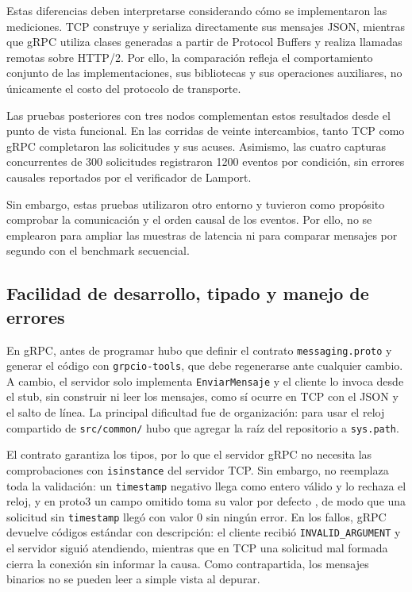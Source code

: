 Estas diferencias deben interpretarse considerando
cómo se implementaron las mediciones. TCP construye
y serializa directamente sus mensajes JSON, mientras
que gRPC utiliza clases generadas a partir de
Protocol Buffers y realiza llamadas remotas sobre
HTTP/2. Por ello, la comparación refleja el
comportamiento conjunto de las implementaciones,
sus bibliotecas y sus operaciones auxiliares,
no únicamente el costo del protocolo de transporte.

Las pruebas posteriores con tres nodos complementan
estos resultados desde el punto de vista funcional.
En las corridas de veinte intercambios, tanto TCP
como gRPC completaron las solicitudes y sus acuses.
Asimismo, las cuatro capturas concurrentes de
300 solicitudes registraron 1200 eventos por
condición, sin errores causales reportados por
el verificador de Lamport.

Sin embargo, estas pruebas utilizaron otro entorno
y tuvieron como propósito comprobar la comunicación
y el orden causal de los eventos. Por ello, no se
emplearon para ampliar las muestras de latencia
ni para comparar mensajes por segundo con el
benchmark secuencial.

\subsection{Facilidad de desarrollo, tipado y manejo de errores}

En gRPC, antes de programar hubo que definir el contrato \texttt{messaging.proto} y generar el código con \texttt{grpcio-tools}, que debe regenerarse ante cualquier cambio. A cambio, el servidor solo implementa \texttt{EnviarMensaje} y el cliente lo invoca desde el stub, sin construir ni leer los mensajes, como sí ocurre en TCP con el JSON y el salto de línea. La principal dificultad fue de organización: para usar el reloj compartido de \texttt{src/common/} hubo que agregar la raíz del repositorio a \texttt{sys.path}.

El contrato garantiza los tipos, por lo que el servidor gRPC no necesita las comprobaciones con \texttt{isinstance} del servidor TCP. Sin embargo, no reemplaza toda la validación: un \texttt{timestamp} negativo llega como entero válido y lo rechaza el reloj, y en proto3 un campo omitido toma su valor por defecto \cite{protobufProto3}, de modo que una solicitud sin \texttt{timestamp} llegó con valor 0 sin ningún error. En los fallos, gRPC devuelve códigos estándar con descripción: el cliente recibió \texttt{INVALID\_ARGUMENT} y el servidor siguió atendiendo, mientras que en TCP una solicitud mal formada cierra la conexión sin informar la causa. Como contrapartida, los mensajes binarios no se pueden leer a simple vista al depurar.

